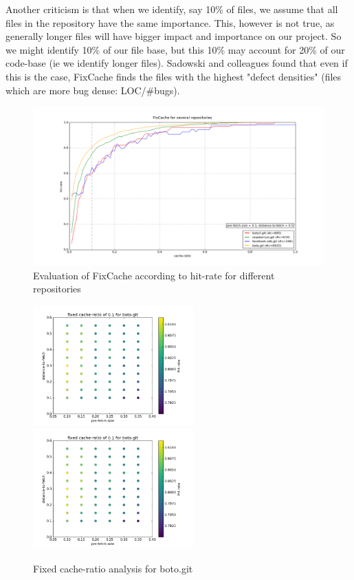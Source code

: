 \documentclass[12pt,twoside,notitlepage]{report}
\newcommand{\fxch}{FixCache }
\begin{document}
Another criticism is that when we identify, say 10\% of files, we assume that all files in the repository have the same importance. This, however is not true, as generally longer files will have bigger impact and importance on our project. So we might identify 10\% of our file base, but this 10\% may account for 20\% of our code-base (ie we identify longer files). Sadowski and colleagues \cite{Bugcache} found that even if this is the case, \fxch finds the files with the highest "defect densities" (files which are more bug dense: LOC/\#bugs).
\clearpage
\begin{figure}[t!]
\includegraphics[width=1.0\textwidth]{figure_3.png}
\caption{Evaluation of \fxch according to hit-rate for different repositories}
\label{fig:v5_repos}
\end{figure}
\begin{figure}[t!]
\includegraphics[width=0.55\textwidth]{figure_5-1.png}
\includegraphics[width=0.55\textwidth]{figure_5-1.png}
\caption{Fixed cache-ratio analysis for boto.git}
\label{fig:fixed_cache}
\end{figure}
\end{document}
